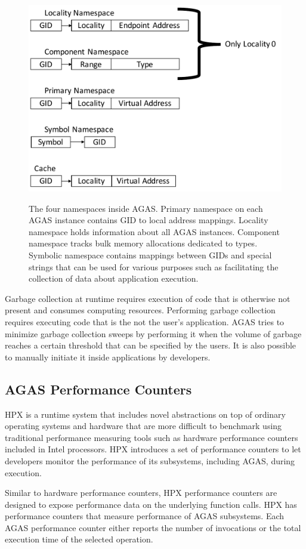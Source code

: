 \begin{figure}[h]
    \centering
    \caption{The four namespaces inside AGAS. Primary namespace on each AGAS instance contains GID to local address mappings. Locality namespace holds information about all AGAS instances. Component namespace tracks bulk memory allocations dedicated to types. Symbolic namespace contains mappings between GIDs and special strings that can be used for various purposes such as facilitating the collection of data about application execution.}
    \includegraphics[width=.47\textwidth,height=\textheight,keepaspectratio]{illustrations/agas_intern}
    \label{fig:agas_intern}
\end{figure}

Garbage collection at runtime requires execution of code that is otherwise not
present and consumes computing resources. Performing garbage collection
requires executing code that is the not the user's application. AGAS tries to
minimize garbage collection sweeps by performing it when the volume of garbage
reaches a certain threshold that can be specified by the users. It is also
possible to manually initiate it inside applications by developers.

\subsection{AGAS Performance Counters}
HPX is a runtime system that includes novel abstractions on top of ordinary
operating systems and hardware that are more difficult to benchmark using traditional
performance measuring tools such as hardware performance counters included in
Intel processors. HPX introduces a set of performance counters to let
developers monitor the performance of its subsystems, including AGAS, during
execution.

Similar to hardware performance counters, HPX performance counters\cite{grubel2015performance} are designed
to expose performance data on the underlying function calls. HPX has
performance counters that measure performance of AGAS subsystems. Each AGAS
performance counter either reports the number of invocations or the total
execution time of the selected operation.

